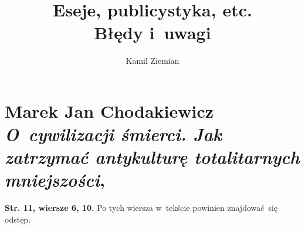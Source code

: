\documentclass[a4paper,11pt]{article}
\title{Eseje, publicystyka, etc. \\
  {\Large Błędy i~uwagi}}
\author{Kamil Ziemian}
\numberwithin{equation}{section}
\begin{document}





\maketitle %





\section{Marek Jan Chodakiewicz
  \textit{O~cywilizacji śmierci. Jak zatrzymać antykulturę
    totalitarnych mniejszości},
  \cite{ChodakiewiczOCywilizacjiSmierci2019}}




\noindent
\textbf{Str. 11, wiersze 6, 10.} Po tych wiersza w~tekście
powinien znajdować~się odstęp.






\end{document}
